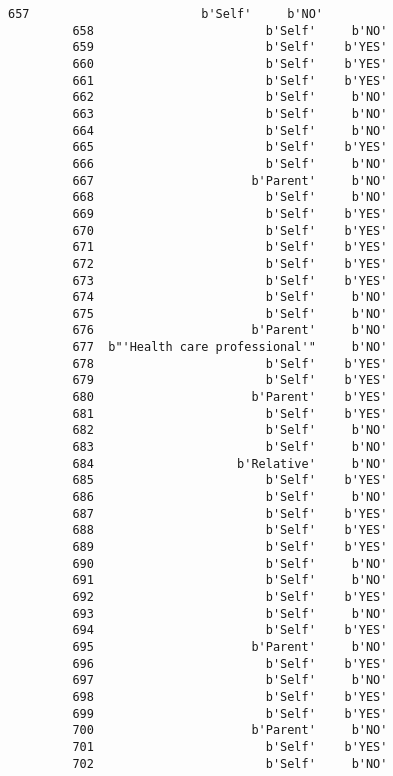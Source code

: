 \documentclass[11pt]{article}
\begin{document}
\begin{Verbatim}[commandchars=\\\{\}]
         657                        b'Self'     b'NO'  
         658                        b'Self'     b'NO'  
         659                        b'Self'    b'YES'  
         660                        b'Self'    b'YES'  
         661                        b'Self'    b'YES'  
         662                        b'Self'     b'NO'  
         663                        b'Self'     b'NO'  
         664                        b'Self'     b'NO'  
         665                        b'Self'    b'YES'  
         666                        b'Self'     b'NO'  
         667                      b'Parent'     b'NO'  
         668                        b'Self'     b'NO'  
         669                        b'Self'    b'YES'  
         670                        b'Self'    b'YES'  
         671                        b'Self'    b'YES'  
         672                        b'Self'    b'YES'  
         673                        b'Self'    b'YES'  
         674                        b'Self'     b'NO'  
         675                        b'Self'     b'NO'  
         676                      b'Parent'     b'NO'  
         677  b"'Health care professional'"     b'NO'  
         678                        b'Self'    b'YES'  
         679                        b'Self'    b'YES'  
         680                      b'Parent'    b'YES'  
         681                        b'Self'    b'YES'  
         682                        b'Self'     b'NO'  
         683                        b'Self'     b'NO'  
         684                    b'Relative'     b'NO'  
         685                        b'Self'    b'YES'  
         686                        b'Self'     b'NO'  
         687                        b'Self'    b'YES'  
         688                        b'Self'    b'YES'  
         689                        b'Self'    b'YES'  
         690                        b'Self'     b'NO'  
         691                        b'Self'     b'NO'  
         692                        b'Self'    b'YES'  
         693                        b'Self'     b'NO'  
         694                        b'Self'    b'YES'  
         695                      b'Parent'     b'NO'  
         696                        b'Self'    b'YES'  
         697                        b'Self'     b'NO'  
         698                        b'Self'    b'YES'  
         699                        b'Self'    b'YES'  
         700                      b'Parent'     b'NO'  
         701                        b'Self'    b'YES'  
         702                        b'Self'     b'NO'  
\end{Verbatim}
            
\end{document}
